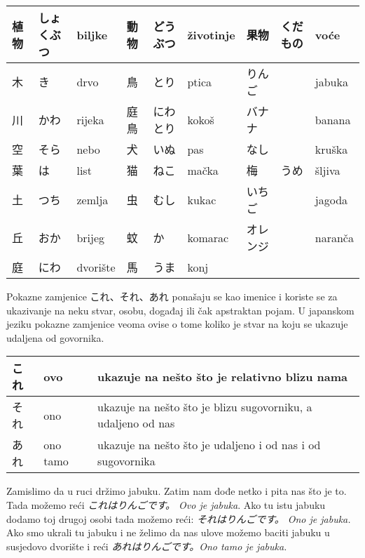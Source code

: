 
\author{Tomislav Mamić, Željka Ludošan}


	
	\vspace{10pt}
	\begin{tabular}{|l|l|l||l||l||l||l||l||l|}
		\hline
		植物&しょくぶつ&biljke&動物&どうぶつ&životinje&果物&くだもの&voće\\\hline
		木&き&drvo&鳥&とり&ptica&りんご&&jabuka\\\hline
		川&かわ&rijeka&庭鳥&にわとり&kokoš&バナナ&&banana\\\hline
		空&そら&nebo&犬&いぬ&pas&なし&&kruška\\\hline
		葉&は&list&猫&ねこ&mačka&梅&うめ&šljiva\\\hline
		土&つち&zemlja&虫&むし&kukac&いちご&&jagoda\\\hline
		丘&おか&brijeg&蚊&か&komarac&オレンジ&&naranča\\\hline
		庭&にわ&dvorište&馬&うま&konj\\\hline
	\end{tabular}
	\vspace{10pt}

	

	Pokazne zamjenice これ、それ、あれ ponašaju se kao imenice i koriste se za ukazivanje na neku stvar, osobu, događaj ili čak apstraktan pojam. U japanskom jeziku pokazne zamjenice veoma ovise o tome koliko je stvar na koju se ukazuje udaljena od govornika.
	
	\vspace{10pt}
	\begin{tabular}{|l|l|l|}
		\hline
		これ&ovo&ukazuje na nešto što je relativno blizu nama\\\hline
		それ&ono&ukazuje na nešto što je blizu sugovorniku, a udaljeno od nas\\\hline
		あれ&ono tamo&ukazuje na nešto što je udaljeno i od nas i od sugovornika\\\hline
	\end{tabular}
	\vspace{10pt}
	
	Zamislimo da u ruci držimo jabuku. Zatim nam dođe netko i pita nas što je to.
	Tada možemo reći \textit{これはりんごです。 Ovo je jabuka}. Ako tu istu jabuku dodamo toj drugoj osobi tada možemo reći:	\textit{それはりんごです。 Ono je jabuka.} Ako smo ukrali tu jabuku i ne želimo da nas ulove možemo baciti jabuku u susjedovo dvorište i reći \textit{あれはりんごです。Ono tamo je jabuka.}
	
